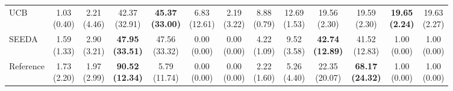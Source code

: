{\begin{tabular}{l|cccccc|cccccc}
UCB & \makecell{1.03 \\ (0.40)} & \makecell{2.21 \\ (4.46)} & {\cellcolor[HTML]{C8E6C9}} \makecell{42.37 \\ (32.91)} & \bfseries \makecell{45.37 \\ (33.00)} & \makecell{6.83 \\ (12.61)} & \makecell{2.19 \\ (3.22)} & \makecell{8.88 \\ (0.79)} & \makecell{12.69 \\ (1.53)} & {\cellcolor[HTML]{C8E6C9}} \makecell{19.56 \\ (2.30)} & \makecell{19.59 \\ (2.30)} & \bfseries \makecell{19.65 \\ (2.24)} & \makecell{19.63 \\ (2.27)} \\
SEEDA & \makecell{1.59 \\ (1.33)} & \makecell{2.90 \\ (3.21)} & {\cellcolor[HTML]{C8E6C9}} \bfseries \makecell{47.95 \\ (33.51)} & \makecell{47.56 \\ (33.32)} & \makecell{0.00 \\ (0.00)} & \makecell{0.00 \\ (0.00)} & \makecell{4.22 \\ (1.09)} & \makecell{9.52 \\ (3.58)} & {\cellcolor[HTML]{C8E6C9}} \bfseries \makecell{42.74 \\ (12.89)} & \makecell{41.52 \\ (12.83)} & \makecell{1.00 \\ (0.00)} & \makecell{1.00 \\ (0.00)} \\
Reference & \makecell{1.73 \\ (2.20)} & \makecell{1.97 \\ (2.99)} & {\cellcolor[HTML]{C8E6C9}} \bfseries \makecell{90.52 \\ (12.34)} & \makecell{5.79 \\ (11.74)} & \makecell{0.00 \\ (0.00)} & \makecell{0.00 \\ (0.00)} & \makecell{2.22 \\ (1.60)} & \makecell{5.26 \\ (4.40)} & {\cellcolor[HTML]{C8E6C9}} \makecell{22.35 \\ (20.07)} & \bfseries \makecell{68.17 \\ (24.32)} & \makecell{1.00 \\ (0.00)} & \makecell{1.00 \\ (0.00)} \\

\end{tabular}}
